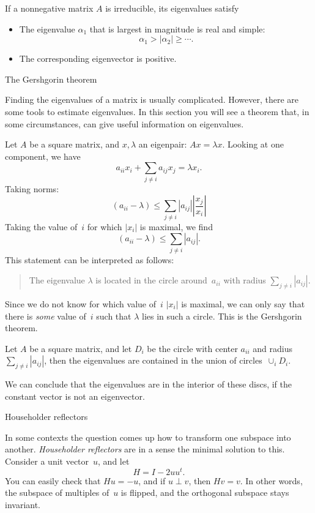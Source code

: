 \begin{theorem}
  If a nonnegative matrix $A$ is irreducible, its eigenvalues
  satisfy
  \begin{itemize}
  \item The eigenvalue $\alpha_1$ that is largest in magnitude is real
    and simple:
    \[ \alpha_1> |\alpha_2|\geq\cdots. \]
  \item The corresponding eigenvector is positive.
  \end{itemize}
\end{theorem}


 {The Gershgorin theorem}
\label{app:gershgorin}

Finding the eigenvalues of a matrix is usually complicated. However,
there are some tools to estimate eigenvalues. In this section you will
see a theorem that, in some circumstances, can give useful information
on eigenvalues.

Let $A$ be a square matrix, and $x,\lambda$ an eigenpair: $Ax=\lambda
x$. Looking at one component, we have
\[ a_{ii}x_i+\sum_{j\not=i} a_{ij}x_j=\lambda x_i. \]
Taking norms:
\[ (a_{ii}-\lambda) \leq \sum_{j\not=i} |a_{ij}|
   \left|\frac{x_j}{x_i}\right|
\]
Taking the value of~$i$ for which $|x_i|$ is maximal, we find
\[ (a_{ii}-\lambda) \leq \sum_{j\not=i} |a_{ij}|.
\]
This statement can be interpreted as follows: 
\begin{quotation}
  The eigenvalue $\lambda$ is located in the circle around~$a_{ii}$
  with radius $\sum_{j\not=i}|a_{ij}|$.
\end{quotation}
Since we do not know for which value of~$i$ $|x_i|$ is maximal, we can
only say that there is \emph{some} value of~$i$ such that $\lambda$
lies in such a circle. This is the Gershgorin theorem.

\begin{theorem}
  Let $A$ be a square matrix, and let $D_i$ be the circle with center
  $a_{ii}$ and radius $\sum_{j\not=i}|a_{ij}|$, then the eigenvalues
  are contained in the union of circles~$\cup_i D_i$.
\end{theorem}

We can conclude that the eigenvalues are in the interior of these
discs, if the constant vector is not an eigenvector.

 {Householder reflectors}
\label{app:reflector}

In some contexts the question comes up how to transform one subspace into another.
\emph{Householder reflectors} are in a sense the minimal solution to this. Consider
a unit vector~$u$, and let \[ H= I-2uu^t. \] You can easily check that $Hu=-u$,
and if $u\perp v$, then $Hv=v$. In other words, the subspace of multiples of~$u$ is 
flipped, and the orthogonal subspace stays invariant.

